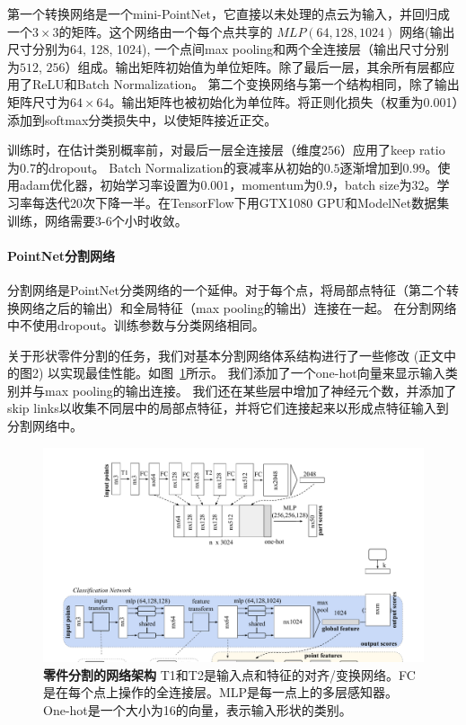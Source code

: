 第一个转换网络是一个mini-PointNet，它直接以未处理的点云为输入，并回归成一个$3\times3$的矩阵。这个网络由一个每个点共享的 $MLP(64,128,1024)$ 网络(输出尺寸分别为64, 128, 1024), 一个点间max pooling和两个全连接层（输出尺寸分别为$512$, $256$）组成。输出矩阵初始值为单位矩阵。除了最后一层，其余所有层都应用了ReLU和Batch Normalization。 第二个变换网络与第一个结构相同，除了输出矩阵尺寸为$64\times64$。输出矩阵也被初始化为单位阵。将正则化损失（权重为0.001）添加到softmax分类损失中，以使矩阵接近正交。

训练时，在估计类别概率前，对最后一层全连接层（维度$256$）应用了keep ratio 为$0.7$的dropout。
Batch Normalization的衰减率从初始的$0.5$逐渐增加到$0.99$。使用adam优化器，初始学习率设置为$0.001$，momentum为$0.9$，batch size为$32$。学习率每迭代20次下降一半。在TensorFlow下用GTX1080 GPU和ModelNet数据集训练，网络需要3-6个小时收敛。

\paragraph{PointNet分割网络}分割网络是PointNet分类网络的一个延伸。对于每个点，将局部点特征（第二个转换网络之后的输出）和全局特征（max pooling的输出）连接在一起。 在分割网络中不使用dropout。训练参数与分类网络相同。

关于形状零件分割的任务，我们对基本分割网络体系结构进行了一些修改 (正文中的图2) 以实现最佳性能。如图~\ref{fig:part_seg_net}所示。 我们添加了一个one-hot向量来显示输入类别并与max pooling的输出连接。 我们还在某些层中增加了神经元个数，并添加了skip links以收集不同层中的局部点特征，并将它们连接起来以形成点特征输入到分割网络中。

\begin{figure}
\centering
\includegraphics[width=\linewidth]{fig/part_seg_net.pdf}
\caption{\textbf{零件分割的网络架构} T1和T2是输入点和特征的对齐/变换网络。FC是在每个点上操作的全连接层。MLP是每一点上的多层感知器。One-hot是一个大小为16的向量，表示输入形状的类别。}
\label{fig:part_seg_net}
\end{figure}

